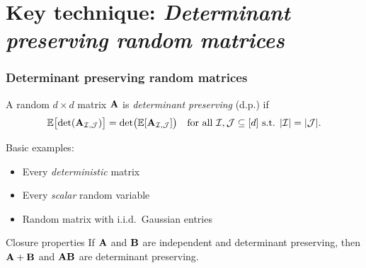 \documentclass{beamer}
\begin{document}
\section{Key technique: \textit{Determinant preserving random matrices}}

\begin{frame}
  \frametitle{Determinant preserving random matrices}
\begin{definition}
A random $d\times d$ matrix $\mathbf A$ is \emph{determinant preserving} (d.p.) if
\begin{align*}
  \mathbb E\big[\!\det(\mathbf A_{\mathcal I,\mathcal{J}})\big] =
  \det\!\big(\mathbb E[\mathbf A_{\mathcal I,\mathcal{J}}]\big)\quad \text{for all }\mathcal I,\mathcal{J}\subseteq
  [d]\text{ s.t. }|\mathcal I|=|\mathcal{J}|.
\end{align*}
\vspace{-7mm}
\end{definition}

Basic examples: \pause
\begin{itemize}
\item Every \textit{deterministic} matrix \pause
\item Every \textit{scalar} random variable \pause
\item Random matrix with i.i.d.~Gaussian entries
\end{itemize}
\pause
\vspace{2mm}

  \begin{block}{Closure properties}
  If $\mathbf A$ and $\mathbf B$ are independent and determinant preserving, then
  $\mathbf A+\mathbf B$ and $\mathbf A\mathbf B$ are determinant preserving. 
  \end{block}
\end{frame}

  
\end{document}
